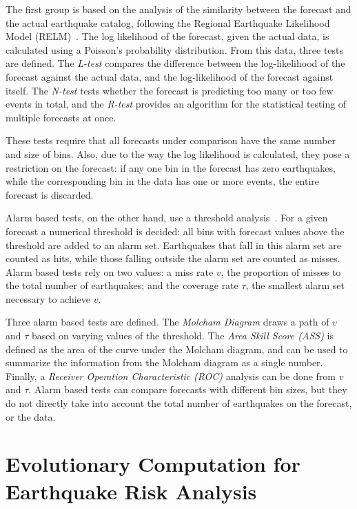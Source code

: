 \documentclass[a4paper,twoside]{article}
\begin{document}
The first group is based on the analysis of the similarity between the
forecast and the actual earthquake catalog, following the Regional
Earthquake Likelihood Model (RELM)~\cite{Schorlemmer2007}. The log
likelihood of the forecast, given the actual data, is calculated using
a Poisson's probability distribution. From this data, three tests are
defined. The \emph{L-test} compares the difference between the
log-likelihood of the forecast against the actual data, and the
log-likelihood of the forecast against itself. The \emph{N-test} tests
whether the forecast is predicting too many or too few events in
total, and the \emph{R-test} provides an algorithm for the statistical
testing of multiple forecasts at once.

These tests require that all forecasts under comparison have the same
number and size of bins. Also, due to the way the log likelihood is
calculated, they pose a restriction on the forecast: if any one bin in
the forecast has zero earthquakes, while the corresponding bin in the
data has one or more events, the entire forecast is discarded.

Alarm based tests, on the other hand, use a threshold
analysis~\cite{Zechar2010}. For a given forecast a numerical threshold
is decided: all bins with forecast values above the threshold are
added to an alarm set. Earthquakes that fall in this alarm set are
counted as hits, while those falling outside the alarm set are counted
as misses. Alarm based tests rely on two values: a miss rate $v$, the
proportion of misses to the total number of earthquakes; and the
coverage rate $\tau$, the smallest alarm set necessary to achieve $v$.

Three alarm based tests are defined. The \emph{Molcham Diagram} draws
a path of $v$ and $\tau$ based on varying values of the threshold. The
\emph{Area Skill Score (ASS)} is defined as the area of the curve
under the Molcham diagram, and can be used to summarize the
information from the Molcham diagram as a single number. Finally, a
\emph{Receiver Operation Characteristic (ROC)} analysis can be done
from $v$ and $\tau$. Alarm based tests can compare forecasts with
different bin sizes, but they do not directly take into account the
total number of earthquakes on the forecast, or the data.

\section{Evolutionary Computation for Earthquake Risk Analysis}
\end{document}
